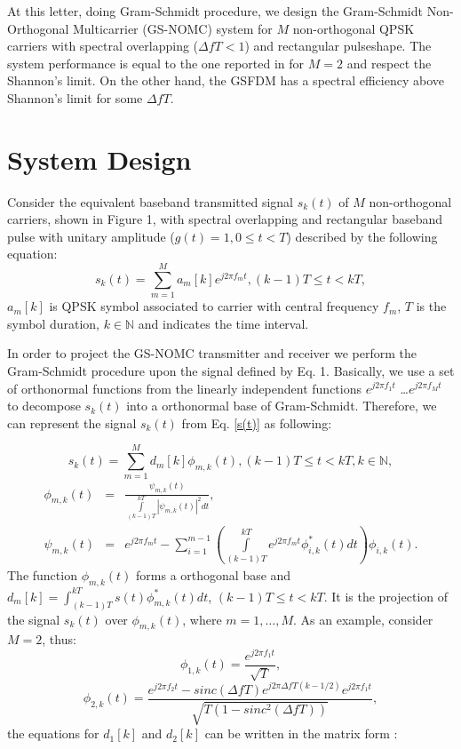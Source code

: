 \documentclass[draftcls,12pt, onecolumn, twoside]{IEEEtran}
\begin{document}
At this letter, doing Gram-Schmidt procedure, we design the Gram-Schmidt Non-Orthogonal Multicarrier (GS-NOMC) system for $M$ non-orthogonal QPSK carriers with spectral overlapping
($\Delta fT<1$) and rectangular pulseshape. The system performance is equal to the one reported in \cite{Lucena} for $M=2$ and respect the Shannon's limit. On the other hand, the GSFDM has a spectral efficiency above Shannon's limit for some $\Delta fT$.
\section{System Design}
Consider the equivalent baseband transmitted signal $s_k(t)$ of $M$ non-orthogonal carriers, shown in Figure 1, with spectral overlapping and  rectangular baseband pulse with unitary amplitude ($g(t)=1, 0\leq t<T$) described by the following equation:
\vspace{-5pt}
\begin{equation}\label{s(t)}
s_k(t)=\sum_{m=1}^{M}a_m[k]e^{j2\pi f_mt}, (k-1)T \leq t<kT, 
\end{equation}
$a_m[k]$  is QPSK symbol associated to carrier with central frequency $f_m$, $T$ is the symbol duration, $k \in \mathbb{N}$ and indicates the time interval. 

In order to project the GS-NOMC transmitter and receiver we perform the Gram-Schmidt procedure upon the signal defined by Eq. 1. Basically, we use a set of orthonormal functions from the linearly independent functions $e^{j2\pi f_1t}$ \ldots $e^{j2\pi f_Mt}$ \cite{Zhang} to decompose $s_k(t)$ into a orthonormal base of Gram-Schmidt.  Therefore, we can represent the signal $s_k(t)$ from Eq. \ref{s(t)} as following:

\begin{equation}\label{s(t)}
s_k(t)  =  \sum_{m=1}^{M}d_m[k]\phi_{m,k}(t), (k-1)T \leq t<kT, k \in \mathbb{N},
\end{equation}
\begin{eqnarray}
\phi_{m,k}(t)&=&\frac{\psi_{m,k}(t)}{\int\limits_{(k-1)T}^{kT}|\psi_{m,k}(t)|^2dt}, \nonumber \\
\psi_{m,k}(t) &=& e^{j2\pi f_mt} -\sum_{i=1}^{m-1}\left(\int\limits_{(k-1)T}^{kT}e^{j2\pi f_mt}\phi^*_{i,k}(t)dt\right)\phi_{i,k}(t). \nonumber
\end{eqnarray}
The function $\phi_{m,k}(t)$ forms a orthogonal base and $d_m[k]=\int_{(k-1)T}^{kT}s(t)\phi ^*_{m,k}(t)dt$, $(k-1)T \leq t<kT$. It is the projection of the signal $s_k(t)$ over $\phi_{m,k}(t)$, where $m=1, \ldots, M$. As an example, consider $M=2$, thus:
\begin{equation} \label{fi1}
\phi_{1,k}(t) = \frac{e^{j2\pi f_1t}}{\sqrt{T}},  
\end{equation}
\begin{equation}\label{fi2}
\phi_{2,k}(t) = \frac{e^{j2\pi f_2t}-sinc(\Delta fT)e^{j2\pi \Delta fT(k-1/2)}e^{j2\pi f_1t}}{\sqrt{T(1-sinc^2(\Delta fT))}},  
\end{equation}
the equations for $d_1[k]$ and $d_2[k]$ can be written in the matrix form :
\end{document}
